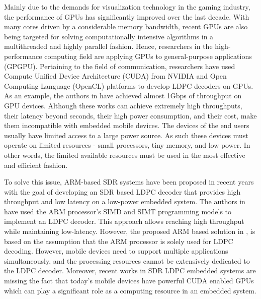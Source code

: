 \documentclass{article}
\begin{document}
Mainly due to the demands for visualization technology in the gaming industry, the performance of GPUs has significantly improved over the last decade. With many cores driven by a considerable memory bandwidth, recent GPUs are also being targeted for solving computationally intensive algorithms in a multithreaded and highly parallel fashion. Hence, researchers in the high-performance computing field are applying GPUs to general-purpose applications (GPGPU). Pertaining to the field of communication, researchers have used Compute Unified Device Architecture (CUDA) from NVIDIA \cite{art_gpu_0,art_cuda_openmp, art_memory_coalesced, art_optimize_0, art_layered1} and Open Computing Language (OpenCL) \cite{art_ldpc_OpenCl} platforms to develop LDPC decoders on GPUs. As an example, the authors in \cite{art_gpu_0} have achieved almost 1Gbps of throughput on GPU devices. Although these works can achieve extremely high throughputs, their latency beyond seconds, their high power consumption, and their cost, make them incompatible with embedded mobile devices. The devices of the end users usually have limited access to a large power source. As such these devices must operate on limited resources - small processors, tiny memory, and low power. In other words, the limited available resources must be used in the most effective and efficient fashion.

To solve this issue, ARM-based SDR systems have been proposed in recent years \cite{art_neon, art_ldpc_cpu0} with the goal of developing an SDR based LDPC decoder that provides high throughput and low latency on a low-power embedded system. The authors in \cite{art_neon} have used the ARM processor's SIMD and SIMT programming models to implement an LDPC decoder. This approach allows reaching high throughput while maintaining low-latency. However, the proposed ARM based solution in \cite{art_neon}, is based on the assumption that the ARM processor is solely used for LDPC decoding. However, mobile devices need to support multiple applications simultaneously, and the processing resources cannot be extensively dedicated to the LDPC decoder. Moreover, recent works in SDR LDPC embedded systems are missing the fact that today's mobile devices have powerful CUDA enabled GPUs which can play a significant role as a computing resource in an embedded system. %
\end{document}
